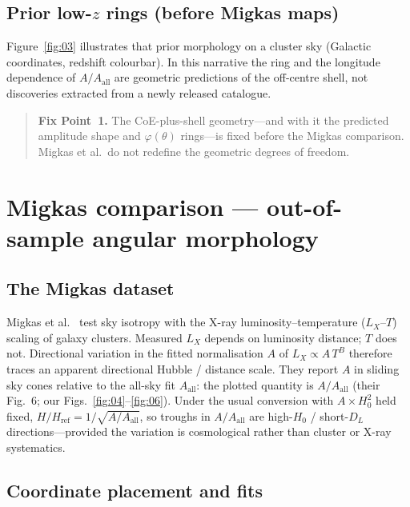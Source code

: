 \documentclass[11pt,a4paper]{article}
\begin{document}
\subsection{Prior low-\(z\) rings (before Migkas maps)}

Figure~\ref{fig:03} illustrates that prior morphology on a cluster sky (Galactic coordinates, redshift colourbar). In this narrative the ring and the longitude dependence of \(A/A_{\mathrm{all}}\) are geometric predictions of the off-centre shell, not discoveries extracted from a newly released catalogue.

\begin{quote}
\textbf{Fix Point~1.} The CoE-plus-shell geometry---and with it the predicted amplitude shape and \(\varphi(\theta)\) rings---is fixed before the Migkas comparison. Migkas et al.\ do not redefine the geometric degrees of freedom.
\end{quote}

\section{Migkas comparison --- out-of-sample angular morphology}
\label{sec:migkas}

\subsection{The Migkas dataset}

Migkas et al.~\cite{migkas2020} test sky isotropy with the X-ray luminosity--temperature (\(L_X\)--\(T\)) scaling of galaxy clusters. Measured \(L_X\) depends on luminosity distance; \(T\) does not. Directional variation in the fitted normalisation \(A\) of \(L_X\propto A\,T^{B}\) therefore traces an apparent directional Hubble / distance scale. They report \(A\) in sliding sky cones relative to the all-sky fit \(A_{\mathrm{all}}\): the plotted quantity is \(A/A_{\mathrm{all}}\) (their Fig.~6; our Figs.~\ref{fig:04}--\ref{fig:06}). Under the usual conversion with \(A\times H_0^{2}\) held fixed, \(H/H_{\mathrm{ref}}=1/\sqrt{A/A_{\mathrm{all}}}\), so troughs in \(A/A_{\mathrm{all}}\) are high-\(H_0\) / short-\(D_L\) directions---provided the variation is cosmological rather than cluster or X-ray systematics.

\subsection{Coordinate placement and fits}
\end{document}
